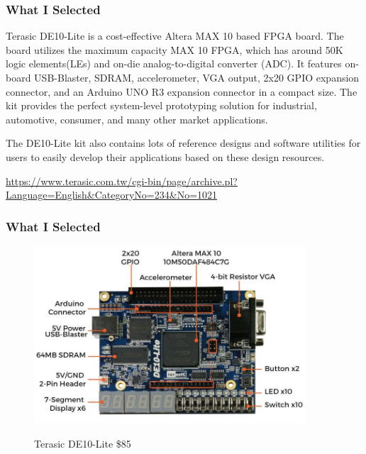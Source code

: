 \documentclass{beamer}
\begin{document}
\begin{frame}
\frametitle{What I Selected}

Terasic DE10-Lite is a cost-effective Altera MAX 10 based FPGA board. The board utilizes the maximum capacity MAX 10 FPGA, which has around 50K logic elements(LEs) and on-die analog-to-digital converter (ADC). It features on-board USB-Blaster, SDRAM, accelerometer, VGA output, 2x20 GPIO expansion connector, and an Arduino UNO R3 expansion connector in a compact size. The kit provides the perfect system-level prototyping solution for industrial, automotive, consumer, and many other market applications.

The DE10-Lite kit also contains lots of reference designs and software utilities for users to easily develop their applications based on these design resources.

{\tiny
\url{https://www.terasic.com.tw/cgi-bin/page/archive.pl?Language=English&CategoryNo=234&No=1021}}

\end{frame}

\begin{frame}
\frametitle{What I Selected}

\begin{figure}[h]
	\centering
	\includegraphics[width=0.9\textwidth]{graphics/de10-lite.jpg}
	\centering\bfseries
	\caption{Terasic DE10-Lite \$85}
\end{figure}

\end{frame}
\end{document}
